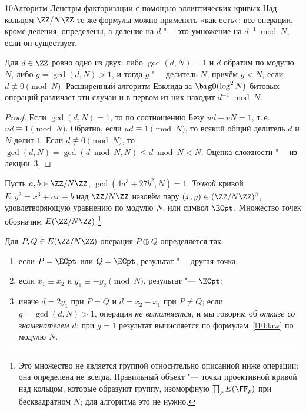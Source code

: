 \begin{lecture}{10}{Алгоритм Ленстры факторизации с помощью эллиптических кривых}
Над кольцом $\ZZ/N\ZZ$ те же формулы можно применять «как есть»: все операции, кроме деления,
определены, а деление на $d$ "--- это умножение на $d^{-1} \bmod N$, если он существует.

\begin{lemma}\label{l10:dichotomy}
Для $d \in \ZZ$ ровно одно из двух: либо $\gcd(d, N) = 1$ и $d$ обратим по модулю $N$, либо
$g = \gcd(d, N) > 1$, и тогда $g$ "--- делитель $N$, причём $g < N$, если $d \not\equiv 0
\pmod N$. Расширенный алгоритм Евклида за $\bigO(\log^2 N)$ битовых операций различает эти
случаи и в первом из них находит $d^{-1} \bmod N$.
\end{lemma}

\begin{proof}
Если $\gcd(d, N) = 1$, то по соотношению Безу $ud + vN = 1$, т.\,е. $ud \equiv 1 \pmod N$.
Обратно, если $ud \equiv 1 \pmod N$, то всякий общий делитель $d$ и $N$ делит $1$. Если
$d \not\equiv 0 \pmod N$, то $\gcd(d, N) = \gcd(d \bmod N, N) \le d \bmod N < N$. Оценка
сложности "--- из лекции~3.
\end{proof}

\begin{definition}
Пусть $a, b \in \ZZ/N\ZZ$, $\gcd(4a^3 + 27b^2, N) = 1$. \emph{Точкой} кривой
$E\colon y^2 = x^3 + ax + b$ над $\ZZ/N\ZZ$ назовём пару $(x, y) \in (\ZZ/N\ZZ)^2$,
удовлетворяющую уравнению по модулю $N$, или символ $\ECpt$. Множество точек обозначим
$E(\ZZ/N\ZZ)$.\footnote{Это множество не является группой относительно описанной ниже
операции: она определена не всегда. Правильный объект "--- точки проективной кривой над
кольцом, которые образуют группу, изоморфную $\prod_{p} E(\FF_p)$ при бесквадратном $N$;
для алгоритма это не нужно.}
\end{definition}

\begin{definition}[псевдосложение]\label{l10:pseudo}
Для $P, Q \in E(\ZZ/N\ZZ)$ операция $P \oplus Q$ определяется так:
\begin{enumerate}
  \item если $P = \ECpt$ или $Q = \ECpt$, результат "--- другая точка;
  \item если $x_1 \equiv x_2$ и $y_1 \equiv -y_2 \pmod N$, результат "--- $\ECpt$;
  \item иначе $d = 2y_1$ при $P = Q$ и $d = x_2 - x_1$ при $P \ne Q$; если
    $g = \gcd(d, N) > 1$, операция \emph{не выполняется}, и мы говорим об \emph{отказе со
    знаменателем $d$}; при $g = 1$ результат вычисляется по формулам~\eqref{l10:law} по модулю $N$.
\end{enumerate}
\end{definition}


\end{lecture}
